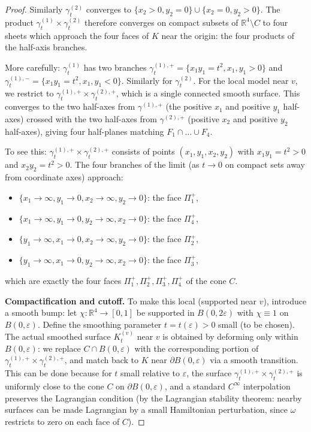 \documentclass[12pt]{article}
\theoremstyle{definition}
\begin{document}
\begin{proof}
Similarly $\gamma_t^{(2)}$ converges to $\{x_2>0,y_2=0\}\cup\{x_2=0,y_2>0\}$. The product $\gamma_t^{(1)}\times\gamma_t^{(2)}$ therefore converges on compact subsets of $\mathbb{R}^4\setminus C$ to four sheets which approach the four faces of $K$ near the origin: the four products of the half-axis branches.

More carefully: $\gamma_t^{(1)}$ has two branches $\gamma_t^{(1),+} = \{x_1y_1=t^2, x_1,y_1>0\}$ and $\gamma_t^{(1),-} = \{x_1y_1=t^2, x_1,y_1<0\}$. Similarly for $\gamma_t^{(2)}$. For the local model near $v$, we restrict to $\gamma_t^{(1),+}\times\gamma_t^{(2),+}$, which is a single connected smooth surface. This converges to the two half-axes from $\gamma^{(1),+}$ (the positive $x_1$ and positive $y_1$ half-axes) crossed with the two half-axes from $\gamma^{(2),+}$ (positive $x_2$ and positive $y_2$ half-axes), giving four half-planes matching $F_1\cap\ldots\cup F_4$.

To see this: $\gamma_t^{(1),+}\times\gamma_t^{(2),+}$ consists of points $(x_1,y_1,x_2,y_2)$ with $x_1y_1=t^2>0$ and $x_2y_2=t^2>0$. The four branches of the limit (as $t\to 0$ on compact sets away from coordinate axes) approach:
\begin{itemize}
  \item $\{x_1\to\infty, y_1\to 0, x_2\to\infty, y_2\to 0\}$: the face $\Pi_1^+$,
  \item $\{x_1\to\infty, y_1\to 0, y_2\to\infty, x_2\to 0\}$: the face $\Pi_4^+$,
  \item $\{y_1\to\infty, x_1\to 0, x_2\to\infty, y_2\to 0\}$: the face $\Pi_2^+$,
  \item $\{y_1\to\infty, x_1\to 0, y_2\to\infty, x_2\to 0\}$: the face $\Pi_3^+$,
\end{itemize}
which are exactly the four faces $\Pi_1^+, \Pi_2^+, \Pi_3^+, \Pi_4^+$ of the cone $C$.

\medskip
\noindent\textbf{Compactification and cutoff.} To make this local (supported near $v$), introduce a smooth bump: let $\chi\colon\mathbb{R}^4\to[0,1]$ be supported in $B(0,2\varepsilon)$ with $\chi\equiv 1$ on $B(0,\varepsilon)$. Define the smoothing parameter $t = t(\varepsilon) > 0$ small (to be chosen). The actual smoothed surface $K_t^{(v)}$ near $v$ is obtained by deforming only within $B(0,\varepsilon)$: we replace $C\cap B(0,\varepsilon)$ with the corresponding portion of $\gamma_t^{(1),+}\times\gamma_t^{(2),+}$, and match back to $K$ near $\partial B(0,\varepsilon)$ via a smooth transition. This can be done because for $t$ small relative to $\varepsilon$, the surface $\gamma_t^{(1),+}\times\gamma_t^{(2),+}$ is uniformly close to the cone $C$ on $\partial B(0,\varepsilon)$, and a standard $C^\infty$ interpolation preserves the Lagrangian condition (by the Lagrangian stability theorem: nearby surfaces can be made Lagrangian by a small Hamiltonian perturbation, since $\omega$ restricts to zero on each face of $C$).


\end{proof}
\end{document}

